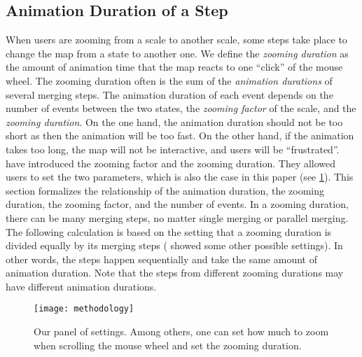 \documentclass[]{interact}
\begin{document}


\subsection{Animation Duration of a Step}
\label{sec:zooming_duration}

When users are zooming from a scale to another scale,
some steps take place to change the map from a state to another one.
We define the \emph{zooming duration} as the amount of 
animation time that the map reacts to one ``click'' of the mouse wheel.
The zooming duration often is the sum of 
the \emph{animation durations} of several merging steps.
The animation duration of each event depends on 
the number of events between the two states,
the \emph{zooming factor} of the scale, and 
the \emph{zooming duration}.
On the one hand, the animation duration should not be too short 
as then the animation will be too fast. 
On the other hand, if the animation takes too long, 
the map will not be interactive, and users will be ``frustrated''.
\citet[][]{Meijers2020Web} 
have introduced the zooming factor and the zooming duration.
They allowed users to set the two parameters,
which is also the case in this paper
(see \fig\ref{fig:interaction_settings}).
This section formalizes the relationship of the animation duration,
the zooming duration, the zooming factor, and the number of events.
In a zooming duration, there can be many merging steps,
no matter single merging or parallel merging.
The following calculation is based on the setting that
a zooming duration is divided equally by its merging steps
(\citet[][]{Suba2017Thesis} showed some other possible settings).
In other words,
the steps happen sequentially and take the same amount of animation duration.
Note that the steps from different zooming durations 
may have different animation durations.

\begin{figure}[tb]
\centering
\texttt{[image: methodology]}
\caption{Our panel of settings. 
Among others, one can set how much to zoom when scrolling the mouse wheel 
and set the zooming duration.}
\label{fig:interaction_settings}
\end{figure}
\end{document}
